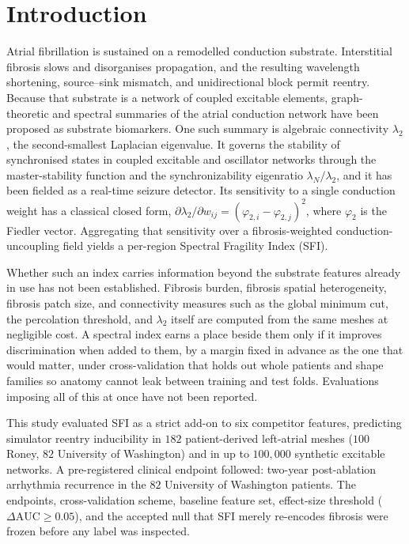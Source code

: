 \documentclass[11pt]{article}
\newcommand{\lam}{\lambda}
\newcommand{\phii}{\varphi}
\newcommand{\dAUC}{\ensuremath{\Delta\mathrm{AUC}}}
\begin{document}
\section{Introduction}
Atrial fibrillation is sustained on a remodelled conduction substrate.
Interstitial fibrosis slows and disorganises propagation, and the resulting
wavelength shortening, source--sink mismatch, and unidirectional block permit
reentry. Because that substrate is a network of coupled excitable elements,
graph-theoretic and spectral summaries of the atrial conduction network have
been proposed as substrate biomarkers. One such summary is algebraic
connectivity $\lam_2$, the second-smallest Laplacian
eigenvalue.\cite{fiedler1973} It governs the stability of synchronised states in
coupled excitable and oscillator networks through the master-stability
function\cite{pecora1998} and the synchronizability
eigenratio $\lam_N/\lam_2$,\cite{barahona2002} and it has been fielded as a
real-time seizure detector.\cite{bomela2020} Its sensitivity to a single
conduction weight has a classical closed form,
$\partial\lam_2/\partial w_{ij}=(\phii_{2,i}-\phii_{2,j})^2$,\cite{ghosh2006}
where $\phii_2$ is the Fiedler vector. Aggregating that
sensitivity over a fibrosis-weighted conduction-uncoupling field yields a
per-region Spectral Fragility Index (SFI).

Whether such an index carries information beyond the substrate features already
in use has not been established. Fibrosis burden, fibrosis spatial
heterogeneity, fibrosis patch size, and connectivity measures such as the global
minimum cut, the percolation threshold, and $\lam_2$ itself are computed from
the same meshes at negligible cost. A spectral index earns a place beside them
only if it improves discrimination when added to them, by a margin fixed in
advance as the one that would matter, under cross-validation that holds out
whole patients and shape families so anatomy cannot leak between training and
test folds. Evaluations imposing all of this at once have not been reported.

This study evaluated SFI as a strict add-on to six competitor features,
predicting simulator reentry inducibility in $182$ patient-derived left-atrial
meshes ($100$ Roney\cite{roney2022}, $82$ University of
Washington\cite{uwboyle2025}) and in up to $100{,}000$ synthetic excitable
networks. A pre-registered clinical endpoint followed: two-year post-ablation
arrhythmia recurrence in the $82$ University of Washington patients. The
endpoints, cross-validation scheme, baseline feature set, effect-size threshold
($\dAUC\geq 0.05$), and the accepted null that SFI merely re-encodes fibrosis
were frozen before any label was inspected.
\end{document}
